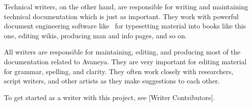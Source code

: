 Technical writers, on the other hand, are responsible for writing and maintaining technical documentation which is just as important. They work with powerful document engineering software like \CONTEXT\ for typesetting material into books like this one, editing wikis, producing man and info pages, and so on.

All writers are responsible for maintaining, editing, and producing most of the documentation related to Avaneya. They are very important for editing material for grammar, spelling, and clarity. They often work closely with researchers, script writers, and other artists as they make suggestions to each other. 

To get started as a writer with this project, see [Writer Contributors].

\StopChapter
